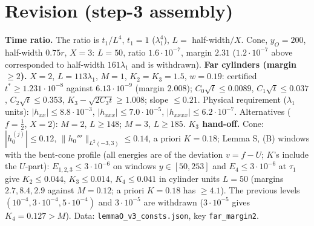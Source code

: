 \documentclass[11pt]{article}
\begin{document}
\section{Revision (step-3 assembly)}
\textbf{Time ratio.} The ratio is $t_1/L^4$, $t_1=1$ ($\lambda_1^4$), $L=$ half-width$/X$. Cone, $y_O=200$, half-width $0.75r$, $X=3$: $L=50$, ratio $1.6\cdot10^{-7}$, margin $2.31$ ($1.2\cdot10^{-7}$ above corresponded to half-width $161\lambda_1$ and is withdrawn). \textbf{Far cylinders (margin $\ge2$).} $X=2$, $L=113\lambda_1$, $M=1$, $K_2=K_3=1.5$, $w=0.19$: certified $t^*\ge1.231\cdot10^{-8}$ against $6.13\cdot10^{-9}$ (margin $2.008$); $C_0\sqrt t\le0.0089$, $C_1\sqrt t\le0.037$, $C_2\sqrt t\le0.353$, $K_3-\sqrt{2C_3t}\ge1.008$; slope $\le0.21$. Physical requirement ($\lambda_1$ units): $|h_{xx}|\le8.8\cdot10^{-3}$, $|h_{xxx}|\le7.0\cdot10^{-5}$, $|h_{xxxx}|\le6.2\cdot10^{-7}$. Alternatives ($f=\frac12$, $X=2$): $M=2$, $L\ge148$; $M=3$, $L\ge185$. \textbf{$K_3$ hand-off.} Cone: $|h_0^{(j)}|\le0.12$, $\|h_0'''\|_{L^2(-3,3)}\le0.14$, a priori $K=0.18$; Lemma S, (B) windows with the bent-cone profile (all energies are of the deviation $v=f-U$; $K$'s include the $U$-part): $E_{1,2,3}\le3\cdot10^{-6}$ on windows $y\in[50,253]$ and $E_4\le3\cdot10^{-6}$ at $\tau_1$ give $K_2\le0.044$, $K_3\le0.014$, $K_4\le0.041$ in cylinder units $L=50$ (margins $2.7,8.4,2.9$ against $M=0.12$; a priori $K=0.18$ has $\ge4.1$). The previous levels $(10^{-4},3\cdot10^{-4},5\cdot10^{-4})$ and $3\cdot10^{-5}$ are withdrawn ($3\cdot10^{-5}$ gives $K_4=0.127>M$). Data: \texttt{lemmaO\_v3\_consts.json}, key \texttt{far\_margin2}.
\end{document}
